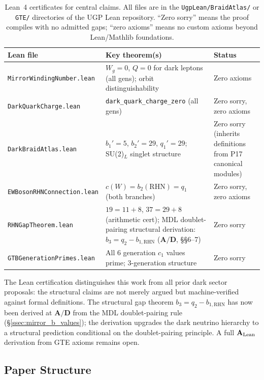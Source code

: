 \documentclass[11pt]{article}
\newcommand{\CatAL}{\ensuremath{\textbf{A}_{\rm Lean}}}
\newcommand{\CatAD}{\textbf{A/D}}
\begin{document}
\begin{table}[H]
\centering
\caption{Lean~4 certificates for central claims. All files are in the
\texttt{UgpLean/BraidAtlas/} or \texttt{GTE/} directories of the UGP Lean repository.
``Zero sorry'' means the proof compiles with no admitted gaps;
``zero axioms'' means no custom axioms beyond Lean/Mathlib foundations.}
\label{tab:lean_summary}
\begin{tabularx}{\textwidth}{P{5.1cm} >{\RaggedRight\arraybackslash}X P{3.2cm}}
\toprule
\textbf{Lean file} & \textbf{Key theorem(s)} & \textbf{Status} \\
\midrule
\texttt{MirrorWindingNumber.lean} & $W_g=0$, $Q=0$ for dark leptons (all gens); orbit distinguishability & Zero axioms \\
\texttt{DarkQuarkCharge.lean} & \texttt{dark\_quark\_charge\_zero} (all gens) & Zero sorry, zero axioms \\
\texttt{DarkBraidAtlas.lean} & $b_1'=5$, $b_2'=29$, $q_1'=29$; SU(2)$_L$ singlet structure & Zero sorry (inherits definitions from P17 canonical modules) \\
\texttt{EWBosonRHNConnection.lean} & $c(W) = b_2(\mathrm{RHN}) = q_1$ (both branches) & Zero sorry, zero axioms \\
\texttt{RHNGapTheorem.lean} & $19=11+8$, $37=29+8$ (arithmetic cert); MDL doublet-pairing structural derivation: $b_3 = q_2 - b_{1,\mathrm{RHN}}$ ($\CatAD$, \S{}§6--7) & Zero sorry \\
\texttt{GTBGenerationPrimes.lean} & All 6 generation $c_1$ values prime; 3-generation structure & Zero sorry \\
\bottomrule
\end{tabularx}
\end{table}

The Lean certification distinguishes this work from all prior dark sector proposals: the
structural claims are not merely argued but machine-verified against formal definitions.
The structural gap theorem $b_3 = q_2 - b_{1,\mathrm{RHN}}$ has now been derived at
$\CatAD$ from the MDL doublet-pairing rule (§\ref{ssec:mirror_b_values}); the derivation
upgrades the dark neutrino hierarchy to a structural prediction conditional on the
doublet-pairing principle. A full $\CatAL$ derivation from GTE axioms remains open.

\subsection{Paper Structure}
\label{ssec:structure}
\end{document}

